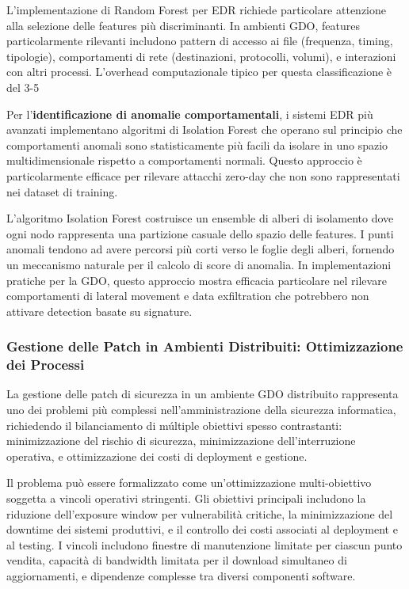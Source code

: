 {L'implementazione di Random Forest per EDR richiede particolare attenzione alla selezione delle features più discriminanti. In ambienti GDO, features particolarmente rilevanti includono pattern di accesso ai file (frequenza, timing, tipologie), comportamenti di rete (destinazioni, protocolli, volumi), e interazioni con altri processi. L'overhead computazionale tipico per questa classificazione è del 3-5%

Per l'\textbf{identificazione di anomalie comportamentali}, i sistemi EDR più avanzati implementano algoritmi di Isolation Forest che operano sul principio che comportamenti anomali sono statisticamente più facili da isolare in uno spazio multidimensionale rispetto a comportamenti normali. Questo approccio è particolarmente efficace per rilevare attacchi zero-day che non sono rappresentati nei dataset di training.

L'algoritmo Isolation Forest costruisce un ensemble di alberi di isolamento dove ogni nodo rappresenta una partizione casuale dello spazio delle features. I punti anomali tendono ad avere percorsi più corti verso le foglie degli alberi, fornendo un meccanismo naturale per il calcolo di score di anomalia. In implementazioni pratiche per la GDO, questo approccio mostra efficacia particolare nel rilevare comportamenti di lateral movement e data exfiltration che potrebbero non attivare detection basate su signature.

\subsubsection{Gestione delle Patch in Ambienti Distribuiti: Ottimizzazione dei Processi}

La gestione delle patch di sicurezza in un ambiente GDO distribuito rappresenta uno dei problemi più complessi nell'amministrazione della sicurezza informatica, richiedendo il bilanciamento di múltiple obiettivi spesso contrastanti: minimizzazione del rischio di sicurezza, minimizzazione dell'interruzione operativa, e ottimizzazione dei costi di deployment e gestione.

Il problema può essere formalizzato come un'ottimizzazione multi-obiettivo soggetta a vincoli operativi stringenti. Gli obiettivi principali includono la riduzione dell'exposure window per vulnerabilità critiche, la minimizzazione del downtime dei sistemi produttivi, e il controllo dei costi associati al deployment e al testing. I vincoli includono finestre di manutenzione limitate per ciascun punto vendita, capacità di bandwidth limitata per il download simultaneo di aggiornamenti, e dipendenze complesse tra diversi componenti software.

}
